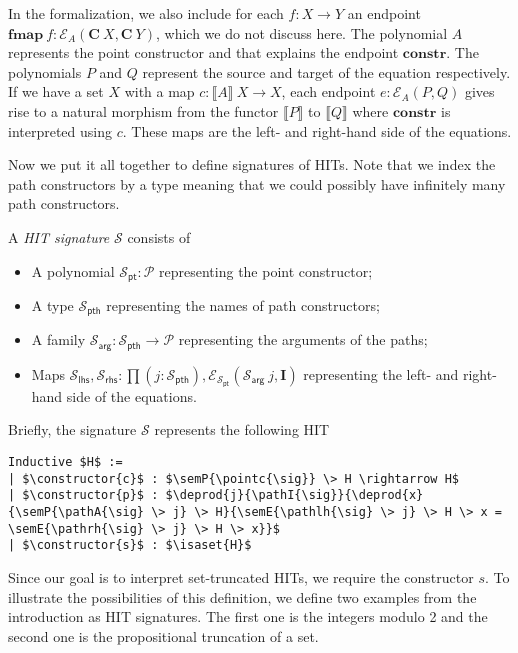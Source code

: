 \documentclass[9pt]{entcs}
\newcommand{\constructor}[1]{\mathbf{#1}}
\newcommand{\function}[1]{\mathsf{#1}}
\newcommand{\deprod}[3]{\prod(#1 : #2), #3} %
\newcommand{\0}{\textbf{0}} %
\newcommand{\isaset}[1]{\function{isaset}(#1)} %
\newcommand{\poly}{\mathcal{P}} %
\newcommand{\C}{\constructor{C}} %
\newcommand{\I}{\constructor{I}} %
\newcommand{\ep}[3]{\mathcal{E}_{#1}(#2,#3)} %
\newcommand{\constr}{\constructor{constr}} %
\newcommand{\fmap}{\constructor{fmap}} %
\newcommand{\pt}[0]{\textsf{pt}}
\newcommand{\pthI}[0]{\textsf{pth}}
\newcommand{\pthA}[0]{\textsf{arg}}
\newcommand{\pthlh}[0]{\textsf{lhs}}
\newcommand{\pthrh}[0]{\textsf{rhs}}
\newcommand{\pointc}[1]{#1_{\pt}} %
\newcommand{\pathI}[1]{#1_{\pthI}} %
\newcommand{\pathA}[1]{#1_{\pthA}} %
\newcommand{\pathlh}[1]{#1_{\pthlh}} %
\newcommand{\pathrh}[1]{#1_{\pthrh}} %
\newcommand{\sig}{\mathcal{S}} %
\newcommand{\semP}[1]{\llbracket #1 \rrbracket} %
\newcommand{\semE}[1]{\llbracket #1 \rrbracket} %
\begin{document}
In the formalization, we also include for each $f : X \rightarrow Y$ an endpoint $\fmap \> f : \ep{A}{\C \> X}{\C \> Y}$, which we do not discuss here.
The polynomial $A$ represents the point constructor and that explains the endpoint $\constr$.
The polynomials $P$ and $Q$ represent the source and target of the equation respectively.
If we have a set $X$ with a map $c : \semP{A} \> X \rightarrow X$, each endpoint $e : \ep{A}{P}{Q}$ gives rise to a natural morphism from the functor $\semP{P}$ to $\semP{Q}$ where $\constr$ is interpreted using $c$.
These maps are the left- and right-hand side of  the equations.

Now we put it all together to define signatures of HITs.
Note that we index the path constructors by a type meaning that we could possibly have infinitely many path constructors.

\begin{definition}
\label{def:signature}
A \emph{HIT signature} $\sig$ consists of
\begin{itemize}
	\item A polynomial $\pointc{\sig} : \poly$ representing the point constructor;
	\item A type $\pathI{\sig}$ representing the names of path constructors;
	\item A family $\pathA{\sig} : \pathI{\sig} \rightarrow \poly$ representing the arguments of the paths;
	\item Maps $\pathlh{\sig}, \pathrh{\sig} : \deprod{j}{\pathI{\sig}}{\ep{\pointc{\sig}}{\pathA{\sig} \> j}{\I}}$ representing the left- and right-hand side of the equations.
\end{itemize}
\end{definition}

Briefly, the signature $\sig$ represents the following HIT

\begin{lstlisting}[mathescape=true]
Inductive $H$ :=
| $\constructor{c}$ : $\semP{\pointc{\sig}} \> H \rightarrow H$
| $\constructor{p}$ : $\deprod{j}{\pathI{\sig}}{\deprod{x}{\semP{\pathA{\sig} \> j} \> H}{\semE{\pathlh{\sig} \> j} \> H \> x = \semE{\pathrh{\sig} \> j} \> H \> x}}$
| $\constructor{s}$ : $\isaset{H}$
\end{lstlisting}

Since our goal is to interpret set-truncated HITs, we require the constructor $s$.
To illustrate the possibilities of this definition, we define two examples from the introduction as HIT signatures.
The first one is the integers modulo 2 and the second one is the propositional truncation of a set.
\end{document}
